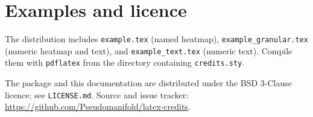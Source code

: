 \documentclass[a4paper,11pt]{article}
\begin{document}
\section{Examples and licence}

The distribution includes \texttt{example.tex} (named heatmap),
\texttt{example\_granular.tex} (numeric heatmap and text), and
\texttt{example\_text.tex} (numeric text). Compile them with
\texttt{pdflatex} from the directory containing \texttt{credits.sty}.

The package and this documentation are distributed under the BSD
3-Clause licence; see \texttt{LICENSE.md}. Source and issue tracker:
\url{https://github.com/Pseudomanifold/latex-credits}.
\end{document}
